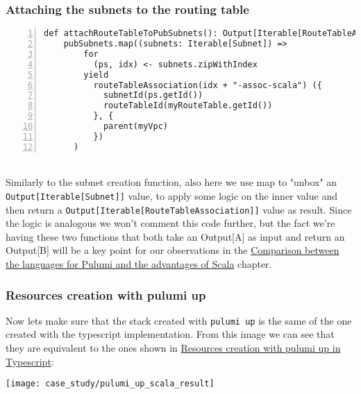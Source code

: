 \subsubsection{Attaching the subnets to the routing table}
\begin{lstlisting}[numbers=left, numberstyle=\tiny, numbersep=-5pt, stepnumber=1]
  def attachRouteTableToPubSubnets(): Output[Iterable[RouteTableAssociation]] =
    pubSubnets.map((subnets: Iterable[Subnet]) =>
        for
          (ps, idx) <- subnets.zipWithIndex
        yield
          routeTableAssociation(idx + "-assoc-scala") ({
            subnetId(ps.getId())
            routeTableId(myRouteTable.getId())
          }, {
            parent(myVpc)
          })
      )
\end{lstlisting}\mbox{}\\
Similarly to the subnet creation function, also here we use map to "unbox" an \texttt{Output[Iterable[Subnet]]} value, to apply some logic on the inner value and then return a \texttt{Output[Iterable[RouteTableAssociation]]} value as result.
Since the logic is analogous we won't comment this code further, but the fact we're having these two functions that both take an Output[A] as input and return an Output[B] will be a key point for our observations in the \hyperref[cap:comparisons]{Comparison between the languages for Pulumi and the advantages of Scala} chapter.

\subsubsection{Resources creation with pulumi up}
\label{sssec:res-cre-ts}
Now lets make sure that the stack created with \texttt{pulumi up} is the same of the one created with the typescript implementation.
From this image we can see that they are equivalent to the ones shown in \hyperref[sssec:res-cre-ts]{Resources creation with pulumi up in Typescript}:
\begin{center}
  \texttt{[image: case\_study/pulumi\_up\_scala\_result]} 
\end{center}\mbox{}\\

